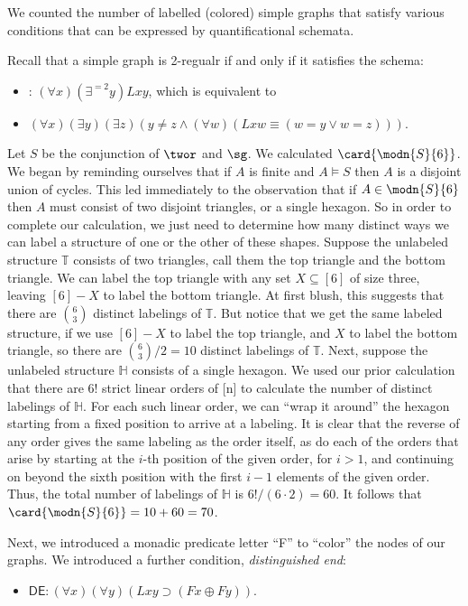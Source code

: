 We counted the number of labelled (colored) simple graphs that satisfy various conditions that can be expressed by quantificational schemata. 

 Recall that a simple graph is 2-regualr if and only if it satisfies the schema:
\begin{itemize}
\item 
\twor: $(\forall x)(\exists^{=2}y)Lxy$, which is equivalent to
\item $(\forall x)(\exists y)(\exists z)(y\neq z\wedge(\forall w)(Lxw\equiv(w=y\vee w=z)))$.
\end{itemize}
Let $S$ be the conjunction of $\twor$ and $\sg$. We calculated $\card{\modn{S}{6}}$. We began by reminding ourselves that if $A$ is finite and $A\models S$ then $A$ is a disjoint union of cycles. This led immediately to the observation that if $A\in \modn{S}{6}$ then $A$ must consist of two disjoint triangles, or a single hexagon. So in order to complete our calculation, we just need to determine how many distinct ways we can label a structure of one or the other of these shapes. Suppose the unlabeled structure $\mathbb{T}$ consists of two triangles, call them the top triangle and the bottom triangle. We can label the top triangle with any set $X\subseteq[6]$ of size three, leaving $[6]-X$ to label the bottom triangle. At first blush, this suggests that there are $\binom{6}{3}$ distinct labelings of $\mathbb{T}$. But notice that we get the same labeled structure, if we use $[6]-X$ to label the top triangle, and $X$ to label the bottom triangle, so there are $\binom{6}{3}/2=10$ distinct labelings of $\mathbb{T}$. Next, suppose the unlabeled structure $\mathbb{H}$ consists of a single hexagon. We used our prior calculation that there are $6!$ strict linear orders of [n] to calculate the number of distinct labelings of $\mathbb{H}$. For each such linear order, we can ``wrap it around'' the hexagon starting from a fixed position to arrive at a labeling. It is clear that the reverse of any order gives the same labeling as the order itself, as do each of the orders that arise by starting at the $i$-th position of the given order, for $i>1$, and continuing on beyond the sixth position with the first $i-1$ elements of the given order. Thus, the total number of labelings of $\mathbb{H}$ is $6!/(6\cdot2)=60$. It follows that $\card{\modn{S}{6}}=10+60=70$.

Next, we introduced a monadic predicate letter ``F'' to ``color'' the nodes of our graphs. We introduced a further condition, \emph{distinguished end}:
\begin{itemize}
\item $\mathsf{DE}: (\forall x)(\forall y)(Lxy\supset (Fx\oplus Fy))$.
\end{itemize}

